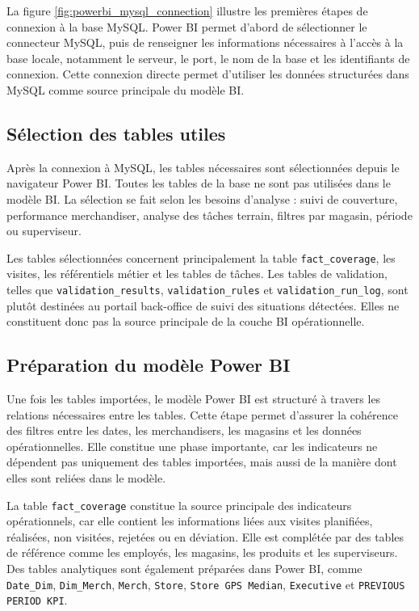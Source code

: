 La figure \ref{fig:powerbi_mysql_connection} illustre les premières étapes de connexion à la base MySQL. Power BI permet d’abord de sélectionner le connecteur MySQL, puis de renseigner les informations nécessaires à l’accès à la base locale, notamment le serveur, le port, le nom de la base et les identifiants de connexion. Cette connexion directe permet d’utiliser les données structurées dans MySQL comme source principale du modèle BI.

\subsection{Sélection des tables utiles}

Après la connexion à MySQL, les tables nécessaires sont sélectionnées depuis le navigateur Power BI. Toutes les tables de la base ne sont pas utilisées dans le modèle BI. La sélection se fait selon les besoins d’analyse : suivi de couverture, performance merchandiser, analyse des tâches terrain, filtres par magasin, période ou superviseur.

Les tables sélectionnées concernent principalement la table \texttt{fact\_coverage}, les visites, les référentiels métier et les tables de tâches. Les tables de validation, telles que \texttt{validation\_results}, \texttt{validation\_rules} et \texttt{validation\_run\_log}, sont plutôt destinées au portail back-office de suivi des situations détectées. Elles ne constituent donc pas la source principale de la couche BI opérationnelle.

\subsection{Préparation du modèle Power BI}

Une fois les tables importées, le modèle Power BI est structuré à travers les relations nécessaires entre les tables. Cette étape permet d’assurer la cohérence des filtres entre les dates, les merchandisers, les magasins et les données opérationnelles. Elle constitue une phase importante, car les indicateurs ne dépendent pas uniquement des tables importées, mais aussi de la manière dont elles sont reliées dans le modèle.

La table \texttt{fact\_coverage} constitue la source principale des indicateurs opérationnels, car elle contient les informations liées aux visites planifiées, réalisées, non visitées, rejetées ou en déviation. Elle est complétée par des tables de référence comme les employés, les magasins, les produits et les superviseurs. Des tables analytiques sont également préparées dans Power BI, comme \texttt{Date\_Dim}, \texttt{Dim\_Merch}, \texttt{Merch}, \texttt{Store}, \texttt{Store GPS Median}, \texttt{Executive} et \texttt{PREVIOUS PERIOD KPI}.

